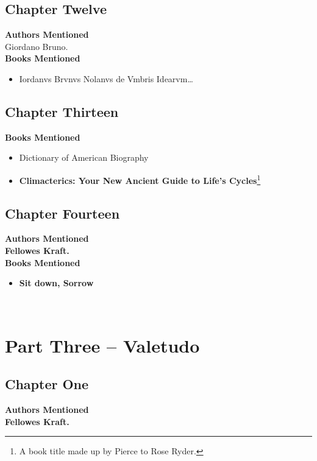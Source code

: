 \documentclass[12pt,makeidx]{extreport}
\newcommand\fleuron{\begin{turn}{45}\Large \ding{166}\end{turn}}
\newcommand\doublefleuron{%
	\reflectbox{\fleuron}\AC\staveXLIX\reflectbox{\AC}\fleuron}
\newcommand\fleuronbar{%
	{\huge\LinearACCCXIII}\xrfill[1.3ex]{1pt}\doublefleuron\xrfill[1.3ex]{1pt}\reflectbox{\huge\LinearACCCXIII}}
\newcommand\nbvspace[1][3]{\vspace*{\stretch{#1}}}
\begin{document}
\section{Chapter Twelve}
\textbf{Authors Mentioned}\\
Giordano Bruno.
\\

\hspace{-1.5em}\textbf{Books Mentioned}
\begin{itemize}
\item Iordanvs Brvnvs Nolanvs de Vmbris Idearvm\ldots \cite{Bruno1582}
\end{itemize}

\section{Chapter Thirteen}
\textbf{Books Mentioned}
\begin{itemize}
\item Dictionary of American Biography \cite{LearnedSocieties1943}
\item \textbf{Climacterics: Your New Ancient Guide to Life’s Cycles}\footnote{A book title made up by Pierce to Rose Ryder.} \cite{Muchon.d}
\end{itemize}

\section{Chapter Fourteen}
\textbf{Authors Mentioned}\\
\textbf{Fellowes Kraft.}
\\

\hspace{-1.5em}\textbf{Books Mentioned}
\begin{itemize}
\item \textbf{Sit down, Sorrow} \cite{Craft1960}
\end{itemize}

\begin{center}
\vfill
\shadowoffset{1pt}
\\
\nbvspace[1]
\end{center}

\chapter{Part Three -- Valetudo}
\section{Chapter One}
\textbf{Authors Mentioned}\\
\textbf{Fellowes Kraft.}
\\
\end{document}
